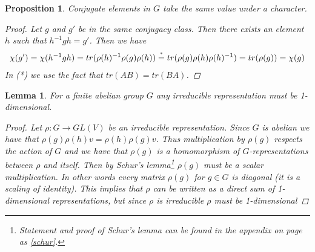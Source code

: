 \documentclass[11pt, a4paper, english]{article}
\newtheorem{prop}{Proposition}
\numberwithin{prop}{section}
\newtheorem{lemma}{Lemma}
\numberwithin{lemma}{section}
\numberwithin{theorem}{section}
\numberwithin{defin}{section}
\numberwithin{example}{section}
\begin{document}
\begin{prop}
Conjugate elements in $G$ take the same value under a character.
\begin{proof}
Let $g$ and $g'$ be in the same conjugacy class. Then there exists an element $h$ such that $h^{-1}gh=g'$. Then we have
\begin{equation*}
\begin{split}
\chi(g')=\chi(h^{-1}gh) = tr(\rho(h)^{-1}\rho(g)\rho(h)) \stackrel{\mathclap{\normalfont\mbox{\tiny{*}}}}{=} tr(\rho(g)\rho(h)\rho(h)^{-1}) = tr(\rho(g))=\chi(g)
\end{split}
\end{equation*}
In (*) we use the fact that $tr(AB)=tr(BA)$.
\end{proof}
\end{prop}

\begin{lemma}
For a finite abelian group $G$ any irreducible representation must be 1-dimensional.
\begin{proof}
Let $\rho: G \to GL(V)$ be an irreducible representation. Since $G$ is abelian we have that $\rho(g)\rho(h)v = \rho(h)\rho(g)v$. Thus multiplication by $\rho(g)$ respects the action of $G$ and we have that $\rho(g)$ is a homomorphism of $G$-representations between $\rho$ and itself. Then by Schur's lemma\footnote{Statement and proof of Schur's lemma can be found in the appendix on page \pageref{schur} as \cref{schur}.} $\rho(g)$ must be a scalar multiplication. In other words every matrix $\rho(g)$ for $g \in G$ is diagonal (it is a scaling of identity). This implies that $\rho$ can be written as a direct sum of 1-dimensional representations, but since $\rho$ is irreducible $\rho$ must be 1-dimensional
\end{proof}
\end{lemma}
\end{document}
